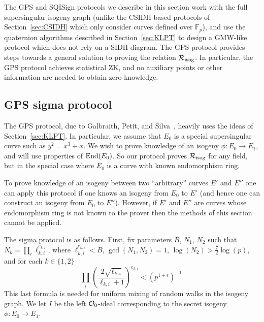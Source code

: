 The GPS and SQISign protocols we describe in this section work with the full supersingular isogeny graph (unlike the CSIDH-based protocols of Section~\ref{sec:CSIDH} which only consider curves defined over $\mathbb{F}_p$), and use the quaternion algorithms described in Section~\ref{sec:KLPT} to design a GMW-like protocol which does not rely on a SIDH diagram. 
The GPS protocol provides steps towards a general solution to proving the relation $\R[isog]$.
In particular, the GPS protocol achieves statistical ZK, and no auxiliary points or other information are needed to obtain zero-knowledge.



\subsection{GPS sigma protocol} \label{sec:GPSproof}




The GPS protocol, due to Galbraith, Petit, and Silva~\cite{GPS20},  heavily uses the ideas of Section~\ref{sec:KLPT}. In particular, we assume that $E_0$ is a special supersingular curve such as $y^2 = x^3 + x$.
We wish to prove knowledge of an isogeny $\phi : E_0 \to E_1$, and will use properties of $\End(E_0)$.
So our protocol proves $\R[isog]$ for any field, but in the special case where $E_0$ is a curve with known endomorphism ring.

To prove knowledge of an isogeny between two ``arbitrary'' curves $E'$ and $E''$ one can apply this protocol if one knows an isogeny from $E_0$ to $E'$ (and hence one can construct an isogeny from $E_0$ to $E''$).
However, if $E'$ and $E''$ are curves whose endomorphism ring is not known to the prover then the methods of this section cannot be applied.

The sigma protocol is as follows.
First, fix parameters $B$, $N_1$, $N_2$ such that $N_k =\prod_i\ell_{k,i}^{e_{k,i}}$, where $\ell_{k,i}^{e_{k,i}}<B$, $\gcd(N_1,N_2)=1$, $\log(N_2) > \tfrac{7}{2} \log(p)$, and for each $k \in \{1,2\}$
\[
  \prod_i\left(\frac{2\sqrt{\ell_{k,i}}}{\ell_{k,i}+1}\right)^{e_{k,i}}<(p^{1+\epsilon})^{-1}. 
\]
This last formula is needed for uniform mixing of random walks in the isogeny graph.
We let $I$ be the left $\OO_0$-ideal corresponding to the secret isogeny $\phi : E_0 \to E_1$.

